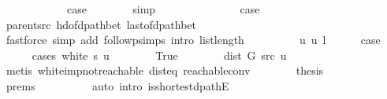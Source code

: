 \begin{isabellebody}
\ \ \ \ \isamarkupfalse%
\ {}\isanewline
\ \ \ \ \isamarkupfalse%
\ {\isacharquery}{\kern0pt}case\isanewline
\ \ \ \ \ \ \isamarkupfalse%
\ simp\isanewline
\ \ \isamarkupfalse%
\isanewline
\ \ \ \ \isamarkupfalse%
\ {}\isanewline
\ \ \ \ \isamarkupfalse%
\ {\isacharquery}{\kern0pt}case\isanewline
\ \ \ \ \ \ \isamarkupfalse%
\ parent{\isacharunderscore}{\kern0pt}src\ hd{\isacharunderscore}{\kern0pt}of{\isacharunderscore}{\kern0pt}dpath{\isacharunderscore}{\kern0pt}bet{\isacharprime}{\kern0pt}\ last{\isacharunderscore}{\kern0pt}of{\isacharunderscore}{\kern0pt}dpath{\isacharunderscore}{\kern0pt}bet\isanewline
\ \ \ \ \ \ \isamarkupfalse%
\ {\isacharparenleft}{\kern0pt}fastforce\ simp\ add{\isacharcolon}{\kern0pt}\ follow{\isacharunderscore}{\kern0pt}psimps\ intro{\isacharcolon}{\kern0pt}\ list{\isacharunderscore}{\kern0pt}length{\isacharunderscore}{\kern0pt}{}{\isacharparenright}{\kern0pt}\isanewline
\ \ \isamarkupfalse%
\isanewline
\ \ \ \ \isamarkupfalse%
\ {\isacharparenleft}{\kern0pt}{}\ u\ u{\isacharprime}{\kern0pt}\ l{\isacharparenright}{\kern0pt}\isanewline
\ \ \ \ \isamarkupfalse%
\ {\isacharquery}{\kern0pt}case\isanewline
\ \ \ \ \isamarkupfalse%
\ {\isacharparenleft}{\kern0pt}cases\ {\isachardoublequoteopen}white\ s\ u{\isachardoublequoteclose}{\isacharparenright}{\kern0pt}\isanewline
\ \ \ \ \ \ \isamarkupfalse%
\ True\isanewline
\ \ \ \ \ \ \isamarkupfalse%
\ {\isachardoublequoteopen}dist\ G\ src\ u\ {\isacharequal}{\kern0pt}\ {\isasyminfinity}{\isachardoublequoteclose}\isanewline
\ \ \ \ \ \ \ \ \isamarkupfalse%
\ {\isacharparenleft}{\kern0pt}metis\ white{\isacharunderscore}{\kern0pt}imp{\isacharunderscore}{\kern0pt}not{\isacharunderscore}{\kern0pt}reachable\ dist{\isacharunderscore}{\kern0pt}eq{\isacharunderscore}{\kern0pt}{\isasymdelta}\ {\isasymdelta}{\isacharunderscore}{\kern0pt}reachable{\isacharunderscore}{\kern0pt}conv{\isacharparenright}{\kern0pt}\isanewline
\ \ \ \ \ \ \isamarkupfalse%
\ {\isacharquery}{\kern0pt}thesis\isanewline
\ \ \ \ \ \ \ \ \isamarkupfalse%
\ {\isachardoublequoteopen}{}{\isachardot}{\kern0pt}prems{\isachardoublequoteclose}{\isacharparenleft}{\kern0pt}{}{\isacharparenright}{\kern0pt}\isanewline
\ \ \ \ \ \ \ \ \isamarkupfalse%
\ {\isacharparenleft}{\kern0pt}auto\ intro{\isacharcolon}{\kern0pt}\ is{\isacharunderscore}{\kern0pt}shortest{\isacharunderscore}{\kern0pt}dpathE{\isacharunderscore}{\kern0pt}{}{\isacharparenright}{\kern0pt}\isanewline

\end{isabellebody}
